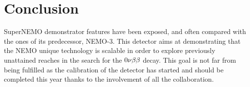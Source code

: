\section{Conclusion}

SuperNEMO demonstrator features have been exposed, and often compared with the ones of its predecessor, NEMO-$3$.
This detector aims at demonstrating that the NEMO unique technology is scalable in order to explore previously unattained reaches in the search for the $0\nu\beta\beta$ decay.
This goal is not far from being fulfilled as the calibration of the detector has started and should be completed this year thanks to the involvement of all the collaboration.
